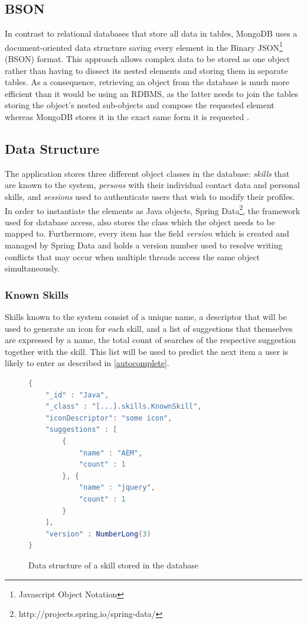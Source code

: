 \subsection{BSON}
\label{BSON}
In contrast to relational databases that store all data in tables, MongoDB uses a document-oriented data structure saving every element in the Binary JSON\footnote{Javascript Object Notation} (BSON) format. This approach allows complex data to be stored as one object rather than having to dissect its nested elements and storing them in separate tables. As a consequence, retrieving an object from the database is much more efficient than it would be using an RDBMS, as the latter needs to join the tables storing the object's nested sub-objects and compose the requested element whereas MongoDB stores it in the exact same form it is requested \cite[p. 10]{MongoGuide}.

\subsection{Data Structure}
The application stores three different object classes in the database: \textit{skills} that are known to the system, \textit{persons} with their individual contact data and personal skills, and \textit{sessions} used to authenticate users that wish to modify their profiles. In order to instantiate the elements as Java objects, Spring Data\footnote{http://projects.spring.io/spring-data/}, the framework used for database access, also stores the class which the object needs to be mapped to. Furthermore, every item has the field \textit{version} which is created and managed by Spring Data and holds a version number used to resolve writing conflicts that may occur when multiple threads access the same object simultaneously.

\newpage
\subsubsection{Known Skills}
Skills known to the system consist of a unique name, a descriptor that will be used to generate an icon for each skill, and a list of suggestions that themselves are expressed by a name, the total count of searches of the respective suggestion together with the skill. This list will be used to predict the next item a user is likely to enter as described in \ref{autocomplete}.
\begin{figure}[h]
\begin{lstlisting}[language=Java]
{
	"_id" : "Java",
	"_class" : "[...].skills.KnownSkill",
	"iconDescriptor": "some icon",
	"suggestions" : [
		{
			"name" : "AEM",
			"count" : 1
		}, {
			"name" : "jquery",
			"count" : 1
		}
	],
	"version" : NumberLong(3)
}
\end{lstlisting}
\caption[Data Structure: Skill]{Data structure of a skill stored in the database}
\end{figure}

